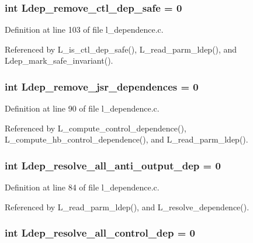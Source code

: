 \subsubsection{\setlength{\rightskip}{0pt plus 5cm}int \bf{Ldep\_\-remove\_\-ctl\_\-dep\_\-safe} = 0}\label{l__dependence_8c_4bb5d2f22feac9f535966256c7e42e1e}




Definition at line 103 of file l\_\-dependence.c.

Referenced by L\_\-is\_\-ctl\_\-dep\_\-safe(), L\_\-read\_\-parm\_\-ldep(), and Ldep\_\-mark\_\-safe\_\-invariant().
\subsubsection{\setlength{\rightskip}{0pt plus 5cm}int \bf{Ldep\_\-remove\_\-jsr\_\-dependences} = 0}\label{l__dependence_8c_102282e21dc3446eb88e572592238fe7}




Definition at line 90 of file l\_\-dependence.c.

Referenced by L\_\-compute\_\-control\_\-dependence(), L\_\-compute\_\-hb\_\-control\_\-dependence(), and L\_\-read\_\-parm\_\-ldep().
\subsubsection{\setlength{\rightskip}{0pt plus 5cm}int \bf{Ldep\_\-resolve\_\-all\_\-anti\_\-output\_\-dep} = 0}\label{l__dependence_8c_5525738349a9e12f9d3c8cd1b1ec43db}




Definition at line 84 of file l\_\-dependence.c.

Referenced by L\_\-read\_\-parm\_\-ldep(), and L\_\-resolve\_\-dependence().
\subsubsection{\setlength{\rightskip}{0pt plus 5cm}int \bf{Ldep\_\-resolve\_\-all\_\-control\_\-dep} = 0}\label{l__dependence_8c_a9a8f59283f1cde323d766c934f57be5}




